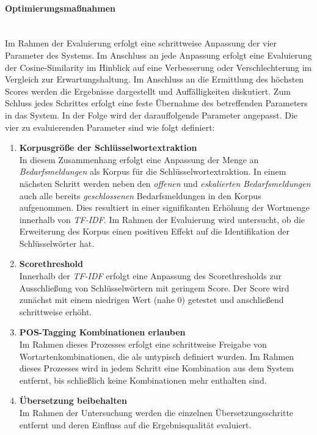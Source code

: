 \paragraph{Optimierungsmaßnahmen}\label{sec:optimierungsmaßnahmen}\mbox{}\\
Im Rahmen der Evaluierung erfolgt eine schrittweise Anpassung der vier Parameter des Systems. Im Anschluss an jede Anpassung erfolgt eine Evaluierung der Cosine-Similarity im Hinblick auf eine Verbesserung oder Verschlechterung im Vergleich zur Erwartungshaltung. Im Anschluss an die Ermittlung des höchsten Scores werden die Ergebnisse dargestellt und Auffälligkeiten diskutiert. Zum Schluss jedes Schrittes erfolgt eine feste Übernahme des betreffenden Parameters in das System. In der Folge wird der darauffolgende Parameter angepasst. Die vier zu evaluierenden Parameter sind wie folgt definiert:
\begin{enumerate}
	\item \textbf{Korpusgröße der Schlüsselwortextraktion} \\ In diesem Zusammenhang erfolgt eine Anpassung der Menge an \emph{Bedarfsmeldungen} als Korpus für die Schlüsselwortextraktion. In einem nächsten Schritt werden neben den \emph{offenen} und \emph{eskalierten} \emph{Bedarfsmeldungen} auch alle bereits \emph{geschlossenen} Bedarfsmeldungen in den Korpus aufgenommen. Dies resultiert in einer signifikanten Erhöhung der Wortmenge innerhalb von \emph{TF-IDF}. Im Rahmen der Evaluierung wird untersucht, ob die Erweiterung des Korpus einen positiven Effekt auf die Identifikation der Schlüsselwörter hat.
	\item \textbf{Scorethreshold} \\ Innerhalb der \emph{TF-IDF} erfolgt eine Anpassung des Scorethresholds zur Ausschließung von Schlüsselwörtern mit geringem Score. Der Score wird zunächst mit einem niedrigen Wert (nahe 0) getestet und anschließend schrittweise erhöht.
	\item \textbf{POS-Tagging Kombinationen erlauben} \\ Im Rahmen dieses Prozesses erfolgt eine schrittweise Freigabe von Wortartenkombinationen, die als untypisch definiert wurden. Im Rahmen dieses Prozesses wird in jedem Schritt eine Kombination aus dem System entfernt, bis schließlich keine Kombinationen mehr enthalten sind.
	\item \textbf{Übersetzung beibehalten} \\ Im Rahmen der Untersuchung werden die einzelnen Übersetzungsschritte entfernt und deren Einfluss auf die Ergebnisqualität evaluiert.
\end{enumerate}
